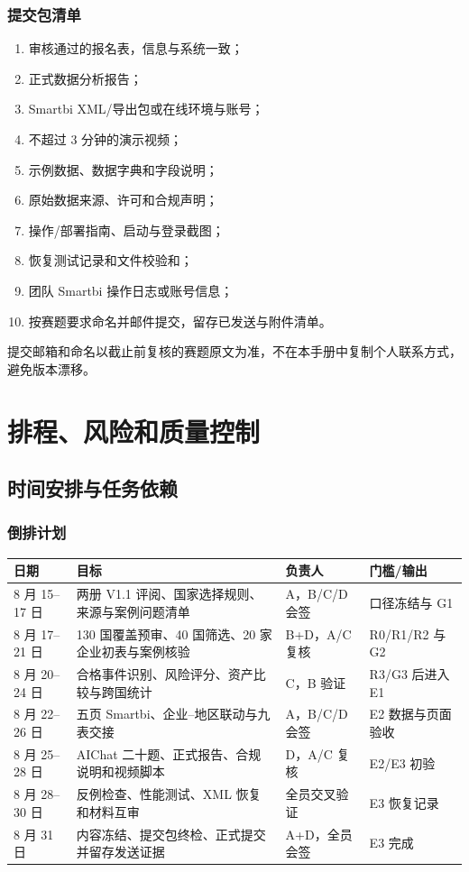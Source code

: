 \documentclass[UTF8,12pt,openany]{ctexbook}
\begin{document}
\section{提交包清单}
\begin{enumerate}[label=\ensuremath{\square}]
  \item 审核通过的报名表，信息与系统一致；
  \item 正式数据分析报告；
  \item Smartbi XML/导出包或在线环境与账号；
  \item 不超过 3 分钟的演示视频；
  \item 示例数据、数据字典和字段说明；
  \item 原始数据来源、许可和合规声明；
  \item 操作/部署指南、启动与登录截图；
  \item 恢复测试记录和文件校验和；
  \item 团队 Smartbi 操作日志或账号信息；
  \item 按赛题要求命名并邮件提交，留存已发送与附件清单。
\end{enumerate}

提交邮箱和命名以截止前复核的赛题原文为准，不在本手册中复制个人联系方式，避免版本漂移。

\part{排程、风险和质量控制}

\chapter{时间安排与任务依赖}

\section{倒排计划}
\begin{longtable}{p{2.8cm}p{5.2cm}p{3.4cm}p{2.7cm}}
\toprule
\textbf{日期} & \textbf{目标} & \textbf{负责人} & \textbf{门槛/输出}\\
\midrule
8 月 15--17 日 & 两册 V1.1 评阅、国家选择规则、来源与案例问题清单 & A，B/C/D 会签 & 口径冻结与 G1\\
8 月 17--21 日 & 130 国覆盖预审、40 国筛选、20 家企业初表与案例核验 & B+D，A/C 复核 & R0/R1/R2 与 G2\\
8 月 20--24 日 & 合格事件识别、风险评分、资产比较与跨国统计 & C，B 验证 & R3/G3 后进入 E1\\
8 月 22--26 日 & 五页 Smartbi、企业--地区联动与九表交接 & A，B/C/D 会签 & E2 数据与页面验收\\
8 月 25--28 日 & AIChat 二十题、正式报告、合规说明和视频脚本 & D，A/C 复核 & E2/E3 初验\\
8 月 28--30 日 & 反例检查、性能测试、XML 恢复和材料互审 & 全员交叉验证 & E3 恢复记录\\
8 月 31 日 & 内容冻结、提交包终检、正式提交并留存发送证据 & A+D，全员会签 & E3 完成\\
\bottomrule
\end{longtable}
\end{document}
